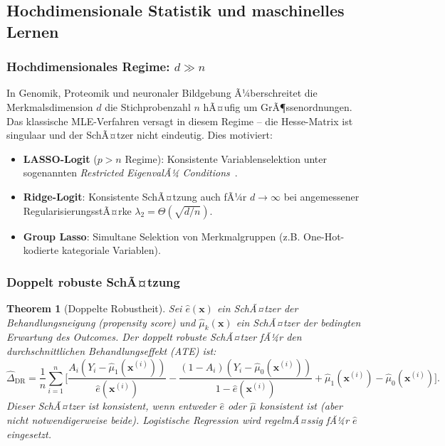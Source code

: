 ﻿\documentclass[12pt, a4paper]{article}
\newtheorem{theorem}{Theorem}[section]
\theoremstyle{definition}
\theoremstyle{remark}
\newcommand{\vx}{\bm{x}}
\begin{document}
\subsection{Hochdimensionale Statistik und maschinelles Lernen}

\subsubsection{Hochdimensionales Regime: $d \gg n$}

In Genomik, Proteomik und neuronaler Bildgebung Ã¼berschreitet die Merkmalsdimension $d$
die Stichprobenzahl $n$ hÃ¤ufig um GrÃ¶ssenordnungen. Das klassische MLE-Verfahren versagt
in diesem Regime -- die Hesse-Matrix ist singulaar und der SchÃ¤tzer nicht eindeutig. Dies
motiviert:

\begin{itemize}
  \item \textbf{LASSO-Logit} ($p > n$ Regime): Konsistente Variablenselektion unter
    sogenannten \emph{Restricted EigenvalÃ¼ Conditions}~\citep{bickel2009simultaneous}.
  \item \textbf{Ridge-Logit}: Konsistente SchÃ¤tzung auch fÃ¼r $d \to \infty$ bei angemessener
    RegularisierungsstÃ¤rke $\lambda_2 = \Theta(\sqrt{d/n})$.
  \item \textbf{Group Lasso}: Simultane Selektion von Merkmalgruppen (z.B. One-Hot-kodierte
    kategoriale Variablen).
\end{itemize}

\subsubsection{Doppelt robuste SchÃ¤tzung}

\begin{theorem}[Doppelte Robustheit]
  Sei $\hat{e}(\vx)$ ein SchÃ¤tzer der Behandlungsneigung (propensity score) und
  $\hat{\mu}_k(\vx)$ ein SchÃ¤tzer der bedingten Erwartung des Outcomes. Der \emph{doppelt
  robuste} SchÃ¤tzer fÃ¼r den durchschnittlichen Behandlungseffekt (ATE) ist:
  \[
    \hat{\Delta}_{\mathrm{DR}}
    = \frac{1}{n}\sum_{i=1}^n \biggl[\frac{A_i(Y_i-\hat{\mu}_1(\vx^{(i)}))}{\hat{e}(\vx^{(i)})}
    - \frac{(1-A_i)(Y_i-\hat{\mu}_0(\vx^{(i)}))}{1-\hat{e}(\vx^{(i)})} + \hat{\mu}_1(\vx^{(i)}) - \hat{\mu}_0(\vx^{(i)})\biggr].
  \]
  Dieser SchÃ¤tzer ist konsistent, wenn \emph{entweder} $\hat{e}$ \emph{oder} $\hat{\mu}$
  konsistent ist (aber nicht notwendigerweise beide). Logistische Regression wird regelmÃ¤ssig
  fÃ¼r $\hat{e}$ eingesetzt.
\end{theorem}
\end{document}
